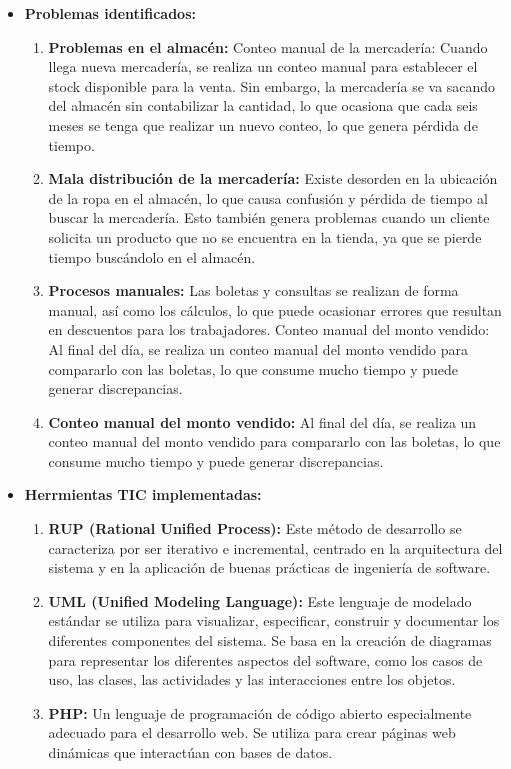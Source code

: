 \documentclass{article}
\begin{document}
\begin{enumerate}
\begin{itemize}
  \item \textbf{Problemas identificados:} 
  \begin{enumerate}
    \item \textbf{Problemas en el almacén:} Conteo manual de la mercadería: Cuando llega nueva mercadería, se realiza un conteo manual para establecer el stock disponible para la venta. Sin embargo, la mercadería se va sacando del almacén sin contabilizar la cantidad, lo que ocasiona que cada seis meses se tenga que realizar un nuevo conteo, lo que genera pérdida de tiempo.
    \item \textbf{Mala distribución de la mercadería:} Existe desorden en la ubicación de la ropa en el almacén, lo que causa confusión y pérdida de tiempo al buscar la mercadería. Esto también genera problemas cuando un cliente solicita un producto que no se encuentra en la tienda, ya que se pierde tiempo buscándolo en el almacén.
    \item \textbf{Procesos manuales:} Las boletas y consultas se realizan de forma manual, así como los cálculos, lo que puede ocasionar errores que resultan en descuentos para los trabajadores. Conteo manual del monto vendido: Al final del día, se realiza un conteo manual del monto vendido para compararlo con las boletas, lo que consume mucho tiempo y puede generar discrepancias.
    \item \textbf{Conteo manual del monto vendido:} Al final del día, se realiza un conteo manual del monto vendido para compararlo con las boletas, lo que consume mucho tiempo y puede generar discrepancias.
  \end{enumerate}
  \item \textbf{Herrmientas TIC implementadas:}
  \begin{enumerate}
    \item \textbf{RUP (Rational Unified Process):} Este método de desarrollo se caracteriza por ser iterativo e incremental, centrado en la arquitectura del sistema y en la aplicación de buenas prácticas de ingeniería de software.
    \item \textbf{UML (Unified Modeling Language):} Este lenguaje de modelado estándar se utiliza para visualizar, especificar, construir y documentar los diferentes componentes del sistema. Se basa en la creación de diagramas para representar los diferentes aspectos del software, como los casos de uso, las clases, las actividades y las interacciones entre los objetos.
    \item \textbf{PHP:} Un lenguaje de programación de código abierto especialmente adecuado para el desarrollo web. Se utiliza para crear páginas web dinámicas que interactúan con bases de datos.

\end{enumerate}
\end{itemize}
\end{enumerate}
\end{document}
